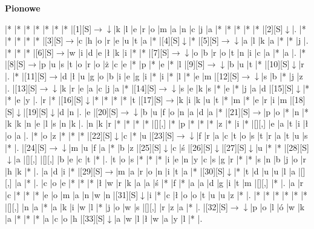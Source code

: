\documentclass[11pt]{article}
\newcommand\drarr{$\rightarrow \!\!\!\!\! \downarrow$}
\newcommand\rarr{$\rightarrow$}
\newcommand\darr{$\downarrow$}
\begin{document}
\begin{PuzzleClues}{\textbf{Pionowe}\\}
\end{PuzzleClues}\newpage%

\noindent\begin{Puzzle}{24}{30}|*	|*	|*	|*	|*	|*	|*	|[1][S]\drarr	|k	|l	|e	|r	|o	|m	|a	|n	|c	|j	|a	|*	|*	|*	|*	|*	|[2][S]\darr	|.
|*	|*	|*	|*	|*	|[3][S]\rarr	|c	|h	|o	|r	|e	|u	|t	|a	|*	|[4][S]\darr	|*	|[5][S]\drarr	|a	|l	|k	|a	|*	|*	|j	|.
|*	|*	|*	|[6][S]\rarr	|w	|i	|d	|e	|ł	|k	|i	|*	|*	|[7][S]\drarr	|o	|b	|r	|o	|t	|n	|i	|c	|a	|*	|a	|.
|*	|[8][S]\rarr	|p	|u	|s	|t	|o	|r	|o	|ż	|c	|e	|*	|p	|*	|e	|*	|l	|[9][S]\drarr	|b	|u	|t	|*	|[10][S]\darr	|r	|.
|*	|[11][S]\rarr	|d	|ł	|u	|g	|o	|b	|i	|e	|g	|i	|*	|i	|*	|l	|*	|e	|m	|[12][S]\drarr	|s	|b	|*	|j	|z	|.
|[13][S]\drarr	|k	|r	|e	|a	|c	|j	|a	|*	|[14][S]\drarr	|s	|e	|k	|s	|*	|e	|*	|j	|a	|d	|[15][S]\darr	|*	|*	|e	|y	|.
|r	|*	|[16][S]\darr	|*	|*	|*	|*	|t	|[17][S]\rarr	|k	|i	|k	|u	|t	|*	|m	|*	|e	|r	|i	|m	|[18][S]\darr	|[19][S]\darr	|d	|n	|.
|e	|[20][S]\drarr	|b	|u	|f	|o	|n	|a	|d	|a	|*	|[21][S]\rarr	|p	|o	|*	|n	|*	|k	|k	|n	|e	|l	|s	|n	|k	|.
|n	|k	|r	|*	|*	|*	|*	|[][,]{ }	|*	|p	|*	|*	|*	|z	|*	|i	|*	|[][,]{ }	|e	|a	|t	|i	|ł	|o	|a	|.
|*	|o	|z	|*	|*	|*	|[22][S]\darr	|c	|*	|u	|[23][S]\drarr	|f	|r	|a	|c	|t	|o	|s	|t	|r	|a	|t	|u	|s	|*	|.
|[24][S]\drarr	|m	|u	|f	|a	|*	|b	|z	|[25][S]\darr	|c	|ś	|[26][S]\darr	|[27][S]\darr	|u	|*	|*	|[28][S]\darr	|a	|[][,]{ }	|[][,]{ }	|b	|e	|c	|t	|*	|.
|t	|o	|s	|*	|*	|*	|i	|e	|n	|y	|c	|s	|g	|r	|*	|*	|s	|n	|b	|j	|o	|r	|h	|k	|*	|.
|a	|d	|i	|*	|[29][S]\rarr	|m	|a	|r	|o	|n	|i	|t	|a	|*	|[30][S]\darr	|*	|t	|d	|u	|u	|l	|a	|[][,]{ }	|a	|*	|.
|c	|o	|e	|*	|*	|*	|ł	|w	|r	|k	|a	|a	|ś	|*	|f	|*	|a	|a	|d	|g	|i	|t	|m	|[][,]{ }	|*	|.
|a	|r	|c	|*	|*	|*	|e	|o	|m	|a	|n	|w	|n	|[31][S]\darr	|i	|*	|c	|ł	|o	|o	|t	|u	|u	|z	|*	|.
|*	|*	|*	|*	|*	|*	|[][,]{ }	|n	|a	|*	|a	|k	|i	|w	|l	|*	|j	|o	|w	|s	|[][,]{ }	|r	|z	|a	|*	|.
|[32][S]\drarr	|p	|o	|l	|ó	|w	|k	|a	|*	|*	|*	|a	|c	|o	|h	|[33][S]\darr	|a	|w	|l	|ł	|w	|a	|y	|l	|*	|.

\end{Puzzle}
\end{document}
